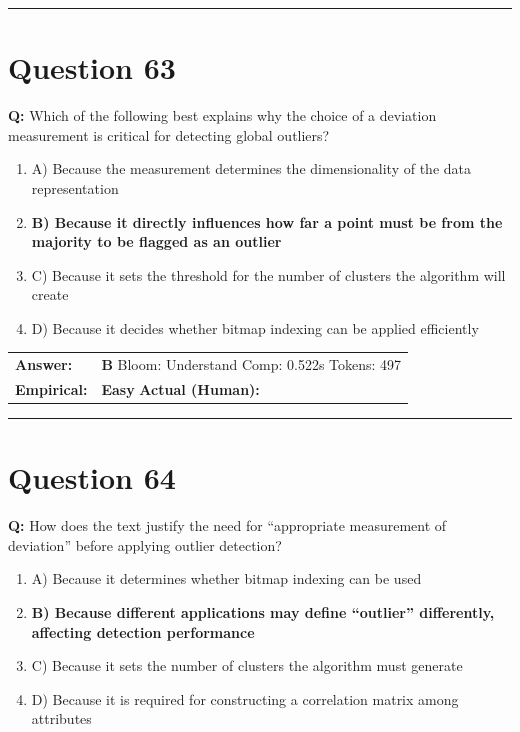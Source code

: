 \documentclass[9pt]{article}
\begin{document}
\vspace{0.2cm}
\rule{\textwidth}{0.4pt}
\vspace{0.2cm}


\section*{Question 63}

\textbf{Q:} Which of the following best explains why the choice of a deviation measurement is critical for detecting global outliers?

\begin{enumerate}[label=\textbf{\alph{*})}, nosep]
    \item A) Because the measurement determines the dimensionality of the data representation
    \item \textbf{B) Because it directly influences how far a point must be from the majority to be flagged as an outlier} %
    \item C) Because it sets the threshold for the number of clusters the algorithm will create
    \item D) Because it decides whether bitmap indexing can be applied efficiently

\end{enumerate}

\begin{tabular}{@{}l p{10.5cm}@{}}
\textbf{Answer:} & \textbf{B} \hspace{1em} Bloom: Understand \hspace{1em} Comp: 0.522s \hspace{1em} Tokens: 497 \\
\textbf{Empirical:} & \textbf{Easy} \hspace{1em} \textbf{Actual (Human):} \underline{\hspace{5cm}}
\end{tabular}

\vspace{0.2cm}
\rule{\textwidth}{0.4pt}
\vspace{0.2cm}


\section*{Question 64}

\textbf{Q:} How does the text justify the need for “appropriate measurement of deviation” before applying outlier detection?

\begin{enumerate}[label=\textbf{\alph{*})}, nosep]
    \item A) Because it determines whether bitmap indexing can be used
    \item \textbf{B) Because different applications may define “outlier” differently, affecting detection performance} %
    \item C) Because it sets the number of clusters the algorithm must generate
    \item D) Because it is required for constructing a correlation matrix among attributes

\end{enumerate}
\end{document}
